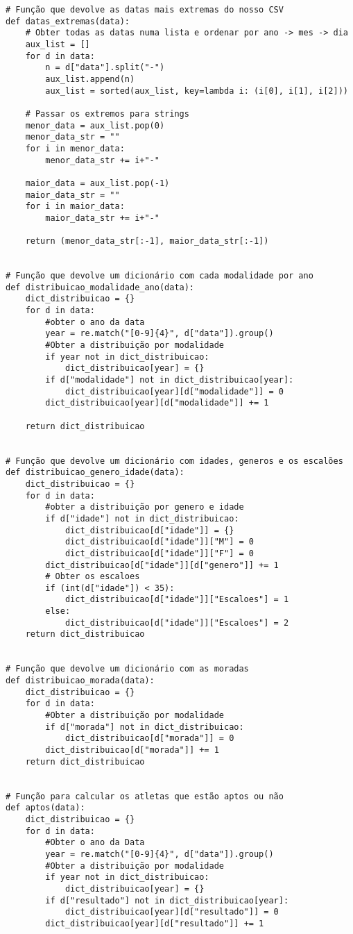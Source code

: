 \documentclass[11pt,a4paper]{report}%
\begin{document}
\begin{verbatim}
# Função que devolve as datas mais extremas do nosso CSV
def datas_extremas(data):
    # Obter todas as datas numa lista e ordenar por ano -> mes -> dia
    aux_list = []
    for d in data:
        n = d["data"].split("-")
        aux_list.append(n)
        aux_list = sorted(aux_list, key=lambda i: (i[0], i[1], i[2]))

    # Passar os extremos para strings
    menor_data = aux_list.pop(0)
    menor_data_str = ""
    for i in menor_data:
        menor_data_str += i+"-"

    maior_data = aux_list.pop(-1)
    maior_data_str = ""
    for i in maior_data:
        maior_data_str += i+"-"

    return (menor_data_str[:-1], maior_data_str[:-1])


# Função que devolve um dicionário com cada modalidade por ano
def distribuicao_modalidade_ano(data):
    dict_distribuicao = {}
    for d in data:
        #obter o ano da data
        year = re.match("[0-9]{4}", d["data"]).group()
        #Obter a distribuição por modalidade
        if year not in dict_distribuicao:
            dict_distribuicao[year] = {}
        if d["modalidade"] not in dict_distribuicao[year]:
            dict_distribuicao[year][d["modalidade"]] = 0
        dict_distribuicao[year][d["modalidade"]] += 1

    return dict_distribuicao


# Função que devolve um dicionário com idades, generos e os escalões
def distribuicao_genero_idade(data):
    dict_distribuicao = {}
    for d in data:
        #obter a distribuição por genero e idade
        if d["idade"] not in dict_distribuicao:
            dict_distribuicao[d["idade"]] = {}
            dict_distribuicao[d["idade"]]["M"] = 0
            dict_distribuicao[d["idade"]]["F"] = 0
        dict_distribuicao[d["idade"]][d["genero"]] += 1
        # Obter os escaloes
        if (int(d["idade"]) < 35):
            dict_distribuicao[d["idade"]]["Escaloes"] = 1
        else:
            dict_distribuicao[d["idade"]]["Escaloes"] = 2
    return dict_distribuicao


# Função que devolve um dicionário com as moradas
def distribuicao_morada(data):
    dict_distribuicao = {}
    for d in data:
        #Obter a distribuição por modalidade
        if d["morada"] not in dict_distribuicao:
            dict_distribuicao[d["morada"]] = 0
        dict_distribuicao[d["morada"]] += 1
    return dict_distribuicao


# Função para calcular os atletas que estão aptos ou não
def aptos(data):
    dict_distribuicao = {}
    for d in data:
        #Obter o ano da Data
        year = re.match("[0-9]{4}", d["data"]).group()
        #Obter a distribuição por modalidade
        if year not in dict_distribuicao:
            dict_distribuicao[year] = {}
        if d["resultado"] not in dict_distribuicao[year]:
            dict_distribuicao[year][d["resultado"]] = 0
        dict_distribuicao[year][d["resultado"]] += 1


\end{verbatim}
\end{document}
